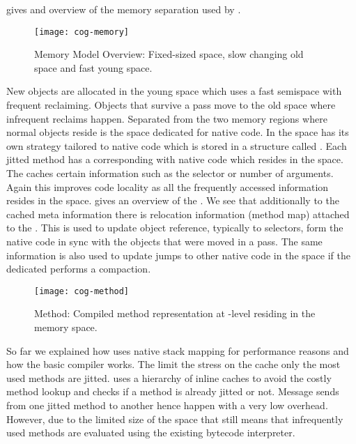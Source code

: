  gives and overview of the memory separation used by \Cog.
%
\begin{figure}[h]
	\centering
	\texttt{[image: cog-memory]}
	\caption[\Cog Memory Model Overview]{\Cog Memory Model Overview: Fixed-sized \JIT space, slow changing old space and fast young space.}
\end{figure}
%
New objects are allocated in the young space which uses a fast semispace \GC with frequent reclaiming.
Objects that survive a \GC pass move to the old space where infrequent reclaims happen.
Separated from the two memory regions where normal \PH objects reside is the \JIT space dedicated for native code.
In \Cog the \JIT space has its own \GC strategy tailored to native code which is stored in a structure called \CogMethod.
Each jitted \PH method has a corresponding \CogMethod with native code which resides in the \JIT space.
The \CogMethod caches certain information such as the selector or number of arguments.
Again this improves code locality as all the frequently accessed information resides in the \JIT space.
 gives an overview of the \CogMethod.
We see that additionally to the cached meta information there is relocation information (method map) attached to the \CogMethod.
This is used to update object reference, typically to selectors, form the native code in sync with the objects that were moved in a \GC pass.
The same information is also used to update jumps to other native code in the \JIT space if the dedicated \JIT \GC performs a compaction.
%
\begin{figure}[h]
	\centering
	\texttt{[image: cog-method]}
	\caption[\Cog Method]{\Cog Method: Compiled method representation at \JIT-level residing in the \JIT memory space.}
\end{figure}

\noindent So far we explained how \Cog uses native stack mapping for performance reasons and how the basic \JIT compiler works.
The limit the stress on the \CPU cache only the most used methods are jitted.
\Cog uses a hierarchy of inline caches to avoid the costly method lookup and checks if a method is already jitted or not.
Message sends from one jitted method to another hence happen with a very low overhead.
However, due to the limited size of the \JIT space that still means that infrequently used methods are evaluated using the existing bytecode interpreter.



